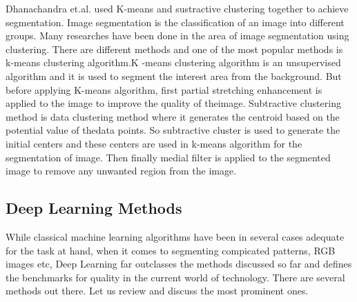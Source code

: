 \documentclass[19pt]{article}
\begin{document}
Dhanachandra et.al. \cite{dhanachandra2015image} used K-means and sustractive clustering together to achieve segmentation. Image segmentation is the classification of an image into different groups. Many researches have been done in the area of image segmentation using clustering. There are different methods and one of the most popular methods is k-means clustering algorithm.K -means clustering algorithm is an unsupervised algorithm and it is used to segment the interest area from the background. But before applying K-means algorithm, first partial stretching enhancement is applied to the image to improve the quality of theimage. Subtractive clustering method is data clustering method where it generates the centroid based on the potential value of thedata points. So subtractive cluster is used to generate the initial centers and these centers are used in k-means algorithm for the segmentation of image. Then finally medial filter is applied to the segmented image to remove any unwanted region from the image. 
\newpage
\subsection{Deep Learning Methods}
While classical machine learning algorithms have been in several cases adequate for the task at hand, when it comes to segmenting compicated patterns, RGB images etc, Deep Learning far outclasses the methods discussed so far and defines the benchmarks for quality in the current world of technology. There are several methods out there. Let us review and discuss the most prominent ones.
\end{document}
